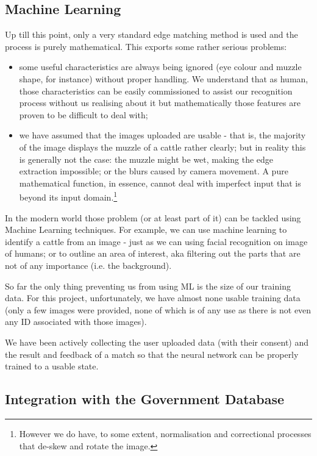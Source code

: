 
\subsection{Machine Learning}

Up till this point, only a very standard edge matching method is used and the process is purely mathematical. This exports some rather serious problems:

\begin{itemize}
	\item some useful characteristics are always being ignored (eye colour and muzzle shape, for instance) without proper handling. We understand that as human, those characteristics can be easily commissioned to assist our recognition process without us realising about it but mathematically those features are proven to be difficult to deal with;
	\item we have assumed that the images uploaded are usable - that is, the majority of the image displays the muzzle of a cattle rather clearly; but in reality this is generally not the case: the muzzle might be wet, making the edge extraction impossible; or the blurs caused by camera movement. A pure mathematical function, in essence, cannot deal with imperfect input that is beyond its input domain.\footnote{However we do have, to some extent, normalisation and correctional processes that de-skew and rotate the image.}
\end{itemize}

In the modern world those problem (or at least part of it) can be tackled using Machine Learning techniques. For example, we can use machine learning to identify a cattle from an image - just as we can using facial recognition on image of humans; or to outline an area of interest, aka filtering out the parts that are not of any importance (i.e. the background).

So far the only thing preventing us from using ML is the size of our training data. For this project, unfortunately, we have almost none usable training data (only a few images were provided, none of which is of any use as there is not even any ID associated with those images).

We have been actively collecting the user uploaded data (with their consent) and the result and feedback of a match so that the neural network can be properly trained to a usable state.

\subsection{Integration with the Government Database}

